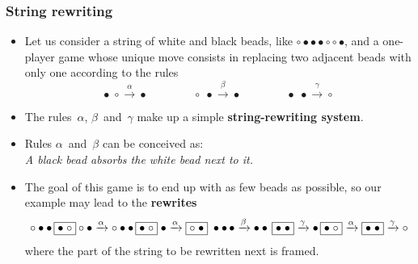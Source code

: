 \documentclass[compress,dvips,xcolor={dvipsnames},t]{beamer}
\begin{document}
\begin{frame}
  \frametitle{String rewriting}

  \begin{itemize}

    \item Let us consider a string of white and black beads, like
      \(\circ \bullet \bullet \bullet \circ \circ \bullet\), and a
      one-player game whose unique move consists in replacing two
      adjacent beads with only one according to the rules
      \begin{equation*}
        \bullet \; \circ   \xrightarrow{\alpha} \bullet\qquad\qquad
        \circ   \; \bullet \xrightarrow{\beta} \bullet\qquad\qquad
        \bullet \; \bullet \xrightarrow{\gamma} \circ
      \end{equation*}

    \item The rules~\(\alpha\), \(\beta\)~and~\(\gamma\) make up a
      simple \textbf{string\hyp{}rewriting system}.

    \item Rules \(\alpha\)~and~\(\beta\) can be conceived
      as:\\ \emph{A black bead absorbs the white bead next to it.}

    \item The goal of this game is to end up with as few beads as
      possible, so our example may lead to the \textbf{rewrites}
      {\small
      \begin{equation*}
        \circ \bullet \bullet \, \fbox{\(\bullet\; \circ\)} \circ
        \bullet \xrightarrow{\alpha} \circ \bullet \bullet \,
        \fbox{\(\bullet\; \circ\)} \; \bullet
        \xrightarrow{\alpha} \fbox{\(\circ \; \bullet\)} \;
        \bullet \bullet \,\bullet \xrightarrow{\beta} \bullet
        \bullet \, \fbox{\(\bullet \; \bullet\)}
        \xrightarrow{\gamma} \bullet \, \fbox{\(\bullet \;
          \circ\)} \xrightarrow{\alpha} \fbox{\(\bullet \;
          \bullet\)} \xrightarrow{\gamma} \circ
      \end{equation*}}
      \noindent where the part of the string to be rewritten next is
      framed.

  \end{itemize}

\end{frame}
\end{document}

